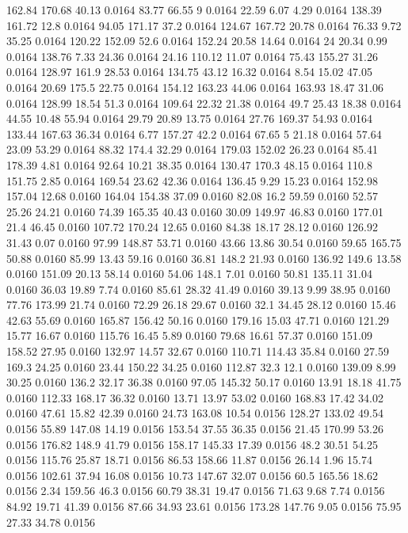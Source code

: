 162.84	170.68	40.13	0.0164
83.77	66.55	9	0.0164
22.59	6.07	4.29	0.0164
138.39	161.72	12.8	0.0164
94.05	171.17	37.2	0.0164
124.67	167.72	20.78	0.0164
76.33	9.72	35.25	0.0164
120.22	152.09	52.6	0.0164
152.24	20.58	14.64	0.0164
24	20.34	0.99	0.0164
138.76	7.33	24.36	0.0164
24.16	110.12	11.07	0.0164
75.43	155.27	31.26	0.0164
128.97	161.9	28.53	0.0164
134.75	43.12	16.32	0.0164
8.54	15.02	47.05	0.0164
20.69	175.5	22.75	0.0164
154.12	163.23	44.06	0.0164
163.93	18.47	31.06	0.0164
128.99	18.54	51.3	0.0164
109.64	22.32	21.38	0.0164
49.7	25.43	18.38	0.0164
44.55	10.48	55.94	0.0164
29.79	20.89	13.75	0.0164
27.76	169.37	54.93	0.0164
133.44	167.63	36.34	0.0164
6.77	157.27	42.2	0.0164
67.65	5	21.18	0.0164
57.64	23.09	53.29	0.0164
88.32	174.4	32.29	0.0164
179.03	152.02	26.23	0.0164
85.41	178.39	4.81	0.0164
92.64	10.21	38.35	0.0164
130.47	170.3	48.15	0.0164
110.8	151.75	2.85	0.0164
169.54	23.62	42.36	0.0164
136.45	9.29	15.23	0.0164
152.98	157.04	12.68	0.0160
164.04	154.38	37.09	0.0160
82.08	16.2	59.59	0.0160
52.57	25.26	24.21	0.0160
74.39	165.35	40.43	0.0160
30.09	149.97	46.83	0.0160
177.01	21.4	46.45	0.0160
107.72	170.24	12.65	0.0160
84.38	18.17	28.12	0.0160
126.92	31.43	0.07	0.0160
97.99	148.87	53.71	0.0160
43.66	13.86	30.54	0.0160
59.65	165.75	50.88	0.0160
85.99	13.43	59.16	0.0160
36.81	148.2	21.93	0.0160
136.92	149.6	13.58	0.0160
151.09	20.13	58.14	0.0160
54.06	148.1	7.01	0.0160
50.81	135.11	31.04	0.0160
36.03	19.89	7.74	0.0160
85.61	28.32	41.49	0.0160
39.13	9.99	38.95	0.0160
77.76	173.99	21.74	0.0160
72.29	26.18	29.67	0.0160
32.1	34.45	28.12	0.0160
15.46	42.63	55.69	0.0160
165.87	156.42	50.16	0.0160
179.16	15.03	47.71	0.0160
121.29	15.77	16.67	0.0160
115.76	16.45	5.89	0.0160
79.68	16.61	57.37	0.0160
151.09	158.52	27.95	0.0160
132.97	14.57	32.67	0.0160
110.71	114.43	35.84	0.0160
27.59	169.3	24.25	0.0160
23.44	150.22	34.25	0.0160
112.87	32.3	12.1	0.0160
139.09	8.99	30.25	0.0160
136.2	32.17	36.38	0.0160
97.05	145.32	50.17	0.0160
13.91	18.18	41.75	0.0160
112.33	168.17	36.32	0.0160
13.71	13.97	53.02	0.0160
168.83	17.42	34.02	0.0160
47.61	15.82	42.39	0.0160
24.73	163.08	10.54	0.0156
128.27	133.02	49.54	0.0156
55.89	147.08	14.19	0.0156
153.54	37.55	36.35	0.0156
21.45	170.99	53.26	0.0156
176.82	148.9	41.79	0.0156
158.17	145.33	17.39	0.0156
48.2	30.51	54.25	0.0156
115.76	25.87	18.71	0.0156
86.53	158.66	11.87	0.0156
26.14	1.96	15.74	0.0156
102.61	37.94	16.08	0.0156
10.73	147.67	32.07	0.0156
60.5	165.56	18.62	0.0156
2.34	159.56	46.3	0.0156
60.79	38.31	19.47	0.0156
71.63	9.68	7.74	0.0156
84.92	19.71	41.39	0.0156
87.66	34.93	23.61	0.0156
173.28	147.76	9.05	0.0156
75.95	27.33	34.78	0.0156
